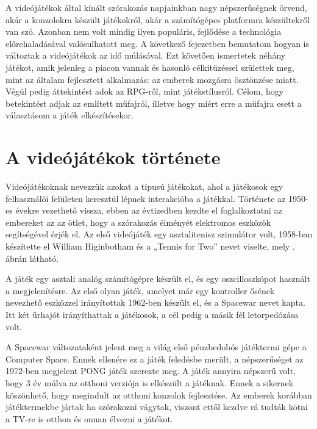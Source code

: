 
A videójátékok által kínált szórakozás napjainkban nagy népszerűségnek örvend, akár a konzolokra készült játékokról, akár a számítógépes platformra készültekről van szó.
Azonban nem volt mindig ilyen populáris, fejlődése a technológia előrehaladásával valósulhatott meg. 
A következő fejezetben bemutatom hogyan is változtak a videójátékok az idő múlásával. 
Ezt követően ismertetek néhány játékot, amik jelenleg a piacon vannak és hasonló célkitűzéssel születtek meg, mint az általam fejlesztett alkalmazás: az emberek mozgásra ösztönzése miatt. 
Végül pedig áttekintést adok az RPG-ről, mint játékstílusról. 
Célom, hogy betekintést adjak az említett műfajról, illetve hogy miért erre a műfajra esett a választásom a játék elkészítésekor. 


\section{A videójátékok története}
\label{videojatektortenet}


Videójátékoknak nevezzük azokat a típusú játékokat, ahol a játékosok egy felhasználói felületen keresztül lépnek interakcióba a játékkal. 
Története az 1950-es évekre vezethető vissza, ebben az évtizedben kezdte el foglalkoztatni az embereket az az ötlet, hogy a szórakozás élményét elektromos eszközök segítségével érjék el. 
Az első videójáték egy asztalitenisz szimulátor volt, 1958-ban készítette el William Higinbotham és a „Tennis for Two” nevet viselte, mely . ábrán látható. 


A játék egy asztali analóg számítógépre készült el, és egy oszcilloszkópot használt a megjelenítésre.  
Az első olyan játék, amelyet már egy kontroller ősének nevezhető eszközzel irányítottak 1962-ben készült el, és a Spacewar nevet kapta. 
Itt két űrhajót irányíthattak a játékosok, a cél pedig a másik fél letorpedózása volt. 

A Spacewar változataként jelent meg a világ első pénzbedobós játéktermi gépe a Computer Space. 
Ennek ellenére ez a játék feledésbe merült, a népszerűséget az 1972-ben megjelent PONG játék szerezte meg. 
A játék annyira népszerű volt, hogy 3 év múlva az otthoni verziója is elkészült a játéknak. 
Ennek a sikernek köszönhető, hogy megindult az otthoni konzolok fejlesztése. 
Az emberek korábban játéktermekbe jártak ha szórakozni vágytak, viszont ettől kezdve rá tudták kötni a TV-re is otthon és onnan élvezni a játékot. 

